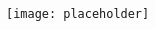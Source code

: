 \documentclass[landscape,a0paper,fontscale=0.285]{baposter} %
\begin{document}
\begin{poster}
{\begin{multicols}{2}
\begin{center}
\texttt{[image: placeholder]}
\end{center}

\end{multicols}

}








\end{poster}
\end{document}
